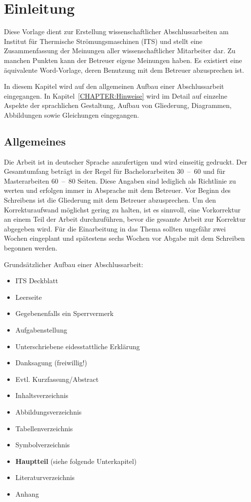 \cleardoublepage

\chapter{Einleitung}
\label{Chapter:Einleitung}

Diese Vorlage dient zur Erstellung wissenschaftlicher Abschlussarbeiten am Institut für Thermische Strömungsmaschinen (ITS) und stellt eine Zusammenfassung der Meinungen aller wissenschaftlicher Mitarbeiter dar. Zu manchen Punkten kann der Betreuer eigene Meinungen haben. Es existiert eine äquivalente Word-Vorlage, deren Benutzung mit dem Betreuer abzusprechen ist. 

In diesem Kapitel wird auf den allgemeinen Aufbau einer Abschlussarbeit eingegangen. In Kapitel~\ref{CHAPTER:Hinweise} wird im Detail auf einzelne Aspekte der sprachlichen Gestaltung, Aufbau von Gliederung, Diagrammen, Abbildungen sowie Gleichungen eingegangen.

\section{Allgemeines}
Die Arbeit ist in deutscher Sprache anzufertigen und wird einseitig gedruckt. Der Gesamtumfang beträgt in der Regel für Bachelorarbeiten 30~--~60 und für Masterarbeiten 60~--~80 Seiten. Diese Angaben sind lediglich als Richtlinie zu werten und erfolgen immer in Absprache mit dem Betreuer. Vor Beginn des Schreibens ist die Gliederung mit dem Betreuer abzusprechen. Um den Korrekturaufwand möglichst gering zu halten, ist es sinnvoll, eine Vorkorrektur an einem Teil der Arbeit durchzuführen, bevor die gesamte Arbeit zur Korrektur abgegeben wird. Für die Einarbeitung in das Thema sollten ungefähr zwei Wochen eingeplant und spätestens sechs Wochen vor Abgabe mit dem Schreiben begonnen werden.

Grundsätzlicher Aufbau einer Abschlussarbeit:
\begin{itemize}
\itemsep0em 
	\item ITS Deckblatt
	\item Leerseite
	\item Gegebenenfalls ein Sperrvermerk
	\item Aufgabenstellung
	\item Unterschriebene eidesstattliche Erklärung
	\item Danksagung (freiwillig!)
	\item Evtl. Kurzfassung/Abstract
	\item Inhaltsverzeichnis
	\item Abbildungsverzeichnis
	\item Tabellenverzeichnis
	\item Symbolverzeichnis
	\item \textbf{Hauptteil} (siehe folgende Unterkapitel)
	\item Literaturverzeichnis
	\item Anhang
\end{itemize}

